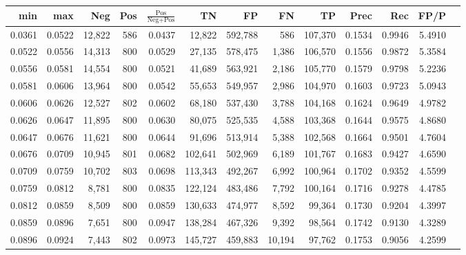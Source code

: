\begin{tabular}{rrrrrrrrrrrrr}
\toprule
   min &    max &    Neg & Pos & $\frac{\text{Pos}}{\text{Neg}+\text{Pos}}$ &      TN &      FP &      FN &      TP &   Prec &    Rec &   FP/P \\
\midrule
0.0361 & 0.0522 & 12,822 & 586 &                                     0.0437 &  12,822 & 592,788 &     586 & 107,370 & 0.1534 & 0.9946 & 5.4910 \\
0.0522 & 0.0556 & 14,313 & 800 &                                     0.0529 &  27,135 & 578,475 &   1,386 & 106,570 & 0.1556 & 0.9872 & 5.3584 \\
0.0556 & 0.0581 & 14,554 & 800 &                                     0.0521 &  41,689 & 563,921 &   2,186 & 105,770 & 0.1579 & 0.9798 & 5.2236 \\
0.0581 & 0.0606 & 13,964 & 800 &                                     0.0542 &  55,653 & 549,957 &   2,986 & 104,970 & 0.1603 & 0.9723 & 5.0943 \\
0.0606 & 0.0626 & 12,527 & 802 &                                     0.0602 &  68,180 & 537,430 &   3,788 & 104,168 & 0.1624 & 0.9649 & 4.9782 \\
0.0626 & 0.0647 & 11,895 & 800 &                                     0.0630 &  80,075 & 525,535 &   4,588 & 103,368 & 0.1644 & 0.9575 & 4.8680 \\
0.0647 & 0.0676 & 11,621 & 800 &                                     0.0644 &  91,696 & 513,914 &   5,388 & 102,568 & 0.1664 & 0.9501 & 4.7604 \\
0.0676 & 0.0709 & 10,945 & 801 &                                     0.0682 & 102,641 & 502,969 &   6,189 & 101,767 & 0.1683 & 0.9427 & 4.6590 \\
0.0709 & 0.0759 & 10,702 & 803 &                                     0.0698 & 113,343 & 492,267 &   6,992 & 100,964 & 0.1702 & 0.9352 & 4.5599 \\
0.0759 & 0.0812 &  8,781 & 800 &                                     0.0835 & 122,124 & 483,486 &   7,792 & 100,164 & 0.1716 & 0.9278 & 4.4785 \\
0.0812 & 0.0859 &  8,509 & 800 &                                     0.0859 & 130,633 & 474,977 &   8,592 &  99,364 & 0.1730 & 0.9204 & 4.3997 \\
0.0859 & 0.0896 &  7,651 & 800 &                                     0.0947 & 138,284 & 467,326 &   9,392 &  98,564 & 0.1742 & 0.9130 & 4.3289 \\
0.0896 & 0.0924 &  7,443 & 802 &                                     0.0973 & 145,727 & 459,883 &  10,194 &  97,762 & 0.1753 & 0.9056 & 4.2599 \\

\end{tabular}
